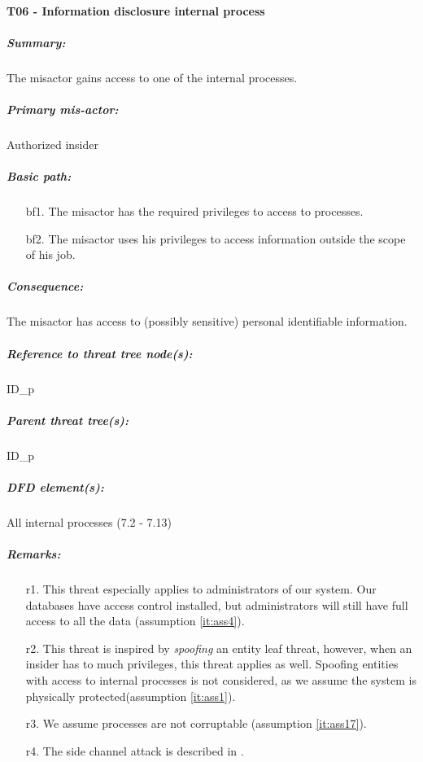 

\paragraph{T06 - Information disclosure internal process}
\label{par:t07}
    \subparagraph{Summary:} The misactor gains access to one of the internal processes.
    \subparagraph{Primary mis-actor:} Authorized insider
    \subparagraph{Basic path:}
    \begin{enumerate}
        \item[bf1.] The misactor has the required privileges to access to processes.
        \item[bf2.] The misactor uses his privileges to access information outside the scope of his job.
    \end{enumerate}
    \subparagraph{Consequence:} The misactor has access to (possibly sensitive) personal identifiable information.


    \subparagraph{Reference to threat tree node(s):} ID\_p
    \subparagraph{Parent threat tree(s):} ID\_p
    \subparagraph{DFD element(s):} All internal processes (7.2 - 7.13)
    \subparagraph{Remarks:}
    \begin{enumerate}
        \item[r1.] This threat especially applies to administrators of our system. Our databases have access control installed,
					but administrators will still have full access to all the data (assumption \ref{it:ass4}).
        \item[r2.] This threat is inspired by \textit{spoofing} an entity leaf threat, however, when an insider has to
much privileges, this threat applies as well. Spoofing entities with access to internal processes
is not considered, as we assume the system is physically protected(assumption \ref{it:ass1}).
		\item[r3.] We assume processes are not corruptable (assumption \ref{it:ass17}).
		\item[r4.] The side channel attack is described in .
    \end{enumerate}



